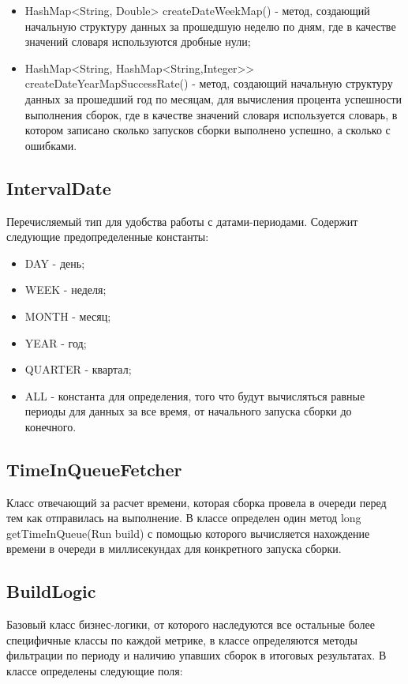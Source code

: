 \begin{itemize}
	\item HashMap<String, Double> createDateWeekMap() - метод, создающий начальную структуру данных за прошедшую неделю по дням, где в качестве значений словаря используются дробные нули;
	\item HashMap<String, HashMap<String,Integer>> createDateYearMapSuccessRate() - метод, создающий начальную структуру данных за прошедший год по месяцам, для вычисления процента успешности выполнения сборок, где в качестве значений словаря используется словарь, в котором записано сколько запусков сборки выполнено успешно, а сколько с ошибками.
\end{itemize}
	
	\subsection{IntervalDate}
	
	Перечисляемый тип для удобства работы с датами-периодами. Содержит следующие предопределенные константы:
	
	\begin{itemize}
	\item DAY - день;
	\item WEEK - неделя;
	\item MONTH - месяц;
	\item YEAR - год;
	\item QUARTER - квартал;
	\item ALL - константа для определения, того что будут вычисляться равные периоды для данных за все время, от начального запуска сборки до конечного.
\end{itemize}

\subsection{TimeInQueueFetcher}

Класс отвечающий за расчет времени, которая сборка провела в очереди перед тем как отправилась на выполнение. В классе определен один метод long getTimeInQueue(Run build) с помощью которого вычисляется нахождение времени в очереди в миллисекундах для конкретного запуска сборки.

\subsection{BuildLogic}
	
Базовый класс бизнес-логики, от которого наследуются все остальные более специфичные классы по каждой метрике, в классе определяются методы фильтрации по периоду и наличию упавших сборок в итоговых результатах. В классе определены следующие поля:


